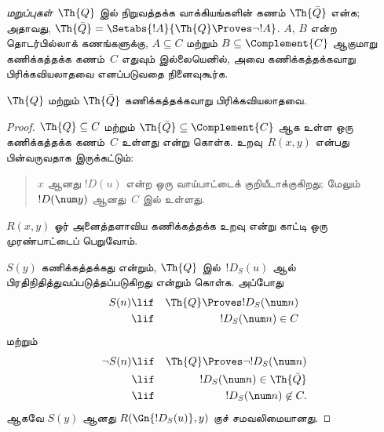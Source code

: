 \documentclass[../../../include/open-logic-section]{subfiles}
\begin{document}



{\em மறுப்புகள்}~$\Th{Q}$ இல் நிறுவத்தக்க வாக்கியங்களின் கணம்
$\Th{\bar Q}$ என்க; அதாவது,
$\Th{\bar Q} = \Setabs{!A}{\Th{Q} \Proves \lnot !A}$.
$A$, $B$ என்ற தொடர்பில்லாக் கணங்களுக்கு, $A \subseteq C$ மற்றும்
$B \subseteq \Complement{C}$ ஆகுமாறு கணிக்கத்தக்க கணம்~$C$ எதுவும்
இல்லையெனில், அவை கணிக்கத்தக்கவாறு பிரிக்கவியலாதவை எனப்படுவதை நினைவுகூர்க.

\begin{lem}
$\Th{Q}$ மற்றும் $\Th{\bar Q}$ கணிக்கத்தக்கவாறு பிரிக்கவியலாதவை.
\end{lem}

\begin{proof}
$\Th{Q} \subseteq C$ மற்றும் $\Th{\bar Q} \subseteq \Complement{C}$ ஆக
உள்ள ஒரு கணிக்கத்தக்க கணம்~$C$ உள்ளது என்று கொள்க. உறவு~$R(x,y)$ என்பது
பின்வருவதாக இருக்கட்டும்:
\begin{quote}
$x$ ஆனது $!D(u)$ என்ற ஒரு வாய்பாட்டைக் குறியீடாக்குகிறது; மேலும்
$!D(\num y)$ ஆனது~$C$ இல் உள்ளது.
\end{quote}
$R(x,y)$ ஓர் அனைத்தளாவிய கணிக்கத்தக்க உறவு என்று காட்டி ஒரு முரண்பாட்டைப்
பெறுவோம்.

$S(y)$ கணிக்கத்தக்கது என்றும், $\Th{Q}$ இல்~$!D_S(u)$ ஆல்
பிரதிநிதித்துவப்படுத்தப்படுகிறது என்றும் கொள்க. அப்போது
\begin{eqnarray*}
S(n) & \lif & \Th{Q} \Proves !D_S(\num n) \\
& \lif & !D_S(\num n) \in C
\end{eqnarray*}
மற்றும்
\begin{eqnarray*}
\lnot S(n) & \lif & \Th{Q} \Proves \lnot !D_S(\num n) \\
& \lif & !D_S(\num n) \in \Th{\bar Q} \\
& \lif & !D_S(\num n) \not\in C.
\end{eqnarray*}
ஆகவே $S(y)$ ஆனது
$R(\Gn{!D_S(u)},y)$ குச் சமவலிமையானது.
\end{proof}
\end{document}
